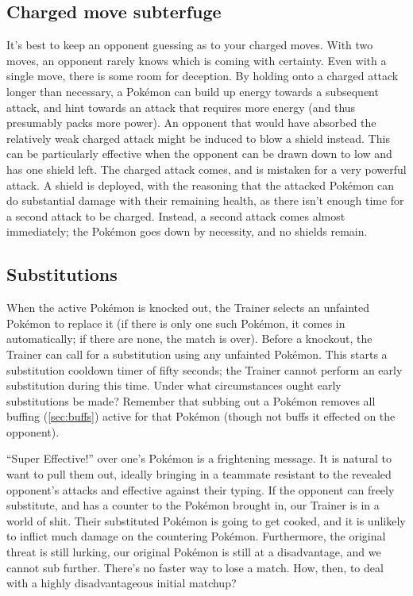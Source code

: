 \subsection{Charged move subterfuge}
It's best to keep an opponent guessing as to your charged moves.
With two moves, an opponent rarely knows which is coming with certainty.
Even with a single move, there is some room for deception.
By holding onto a charged attack longer than necessary, a Pokémon can build
  up energy towards a subsequent attack, and hint towards an attack
  that requires more energy (and thus presumably packs more power).
An opponent that would have absorbed the relatively weak charged attack
  might be induced to blow a shield instead.
This can be particularly effective when the opponent can be drawn down to low \HP{}
  and has one shield left.
The charged attack comes, and is mistaken for a very powerful attack.
A shield is deployed, with the reasoning that the attacked Pokémon can
  do substantial damage with their remaining health, as there isn't
  enough time for a second attack to be charged.
Instead, a second attack comes almost immediately; the Pokémon goes
  down by necessity, and no shields remain.

\subsection{Substitutions\label{subsec:substitutions}}
When the active Pokémon is knocked out, the Trainer selects an unfainted
  Pokémon to replace it (if there is only one such Pokémon, it comes in
  automatically; if there are none, the match is over).
Before a knockout, the Trainer can call for a substitution using any
  unfainted Pokémon.
This starts a substitution cooldown timer of fifty seconds; the Trainer
  cannot perform an early substitution during this time.
Under what circumstances ought early substitutions be made?
Remember that subbing out a Pokémon removes all buffing (\autoref{sec:buffs})
  active for that Pokémon (though not buffs it effected on the opponent).

``Super Effective!'' over one's Pokémon is a frightening message.
It is natural to want to pull them out, ideally bringing in a teammate resistant
  to the revealed opponent's attacks and effective against their typing.
If the opponent can freely substitute, and has a counter to the Pokémon brought in,
  our Trainer is in a world of shit.
Their substituted Pokémon is going to get cooked, and it is unlikely to inflict much damage on the countering Pokémon.
Furthermore, the original threat is still lurking, our original Pokémon is still at a disadvantage,
 and we cannot sub further.
There's no faster way to lose a match.
How, then, to deal with a highly disadvantageous initial matchup?

